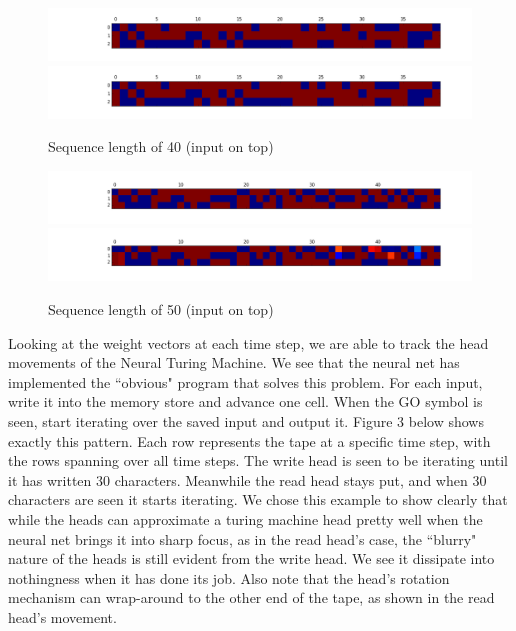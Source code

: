 \documentclass[12pt]{article}
\begin{document}
\begin{figure}[h]
\includegraphics[width=\textwidth]{inputs40}
\includegraphics[width=\textwidth]{outputs40}
\caption{Sequence length of 40 (input on top)}
\includegraphics[width=\textwidth]{inputs50}
\includegraphics[width=\textwidth]{outputs50}
\caption{Sequence length of 50 (input on top)}
\end{figure}

Looking at the weight vectors at each time step, we are able to track
the head movements of the Neural Turing Machine. We see that the neural net has
implemented the ``obvious" program that solves
this problem. For each input, write it into the memory store and advance one cell.
When the
GO symbol is seen, start iterating over the saved input and output it.
Figure 3 below shows exactly this pattern. Each row represents the tape
at a specific time step, with the rows spanning over all time steps. The write head is seen to
be iterating until it has written 30 characters. Meanwhile the read head stays
put, and when 30 characters are seen it starts iterating. We chose this example
to show clearly that while the heads can approximate a turing machine head
pretty well when the neural net brings it into sharp focus, as in the read head's case,
the ``blurry" nature of the heads is still evident from the write head. We
see it dissipate into nothingness when it has done its job. Also note that
the head's rotation mechanism can wrap-around to the other end of the tape, 
as shown in the read head's movement.
\end{document}
